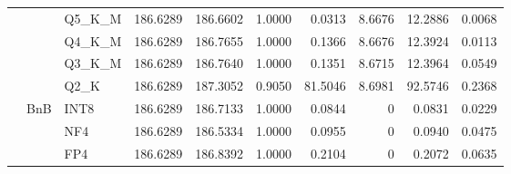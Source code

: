 \begin{table}[t]
{\begin{tabular}{ll l rrrrrrr}
 &  & Q5\_K\_M & 186.6289 & 186.6602 & 1.0000 & 0.0313 & 8.6676 & 12.2886 & 0.0068 \\
 &  & Q4\_K\_M & 186.6289 & 186.7655 & 1.0000 & 0.1366 & 8.6676 & 12.3924 & 0.0113 \\
 &  & Q3\_K\_M & 186.6289 & 186.7640 & 1.0000 & 0.1351 & 8.6715 & 12.3964 & 0.0549 \\
 &  & Q2\_K & 186.6289 & 187.3052 & \cellcolor{red!18} 0.9050 & \cellcolor{red!18} 81.5046 & 8.6981 & \cellcolor{red!18} 92.5746 & \cellcolor{red!18} 0.2368 \\
 & BnB & INT8 & 186.6289 & 186.7133 & 1.0000 & 0.0844 & \cellcolor{cyan!12} $0$ & 0.0831 & 0.0229 \\
 &  & NF4 & 186.6289 & 186.5334 & 1.0000 & 0.0955 & \cellcolor{cyan!12} $0$ & 0.0940 & 0.0475 \\
 &  & FP4 & 186.6289 & 186.8392 & 1.0000 & 0.2104 & \cellcolor{cyan!12} $0$ & 0.2072 & 0.0635 \\
\bottomrule
\end{tabular}}
\end{table}